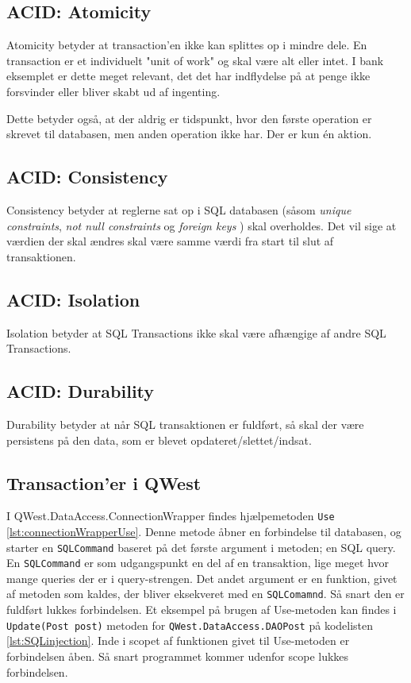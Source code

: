 \subsection{ACID: Atomicity}\label{sec:acidAtomic}
Atomicity betyder at transaction'en ikke kan splittes op i mindre dele. En transaction er et individuelt "unit of work" og skal være alt eller intet. \cite{DistributedSystems} I bank eksemplet er dette meget relevant, det det har indflydelse på at penge ikke forsvinder eller bliver skabt ud af ingenting. 

Dette betyder også, at der aldrig er tidspunkt, hvor den første operation er skrevet til databasen, men anden operation ikke har. Der er kun én aktion.

\subsection{ACID: Consistency}\label{sec:acidConsistent}
Consistency betyder at reglerne sat op i SQL databasen (såsom \textit{unique constraints}, \textit{not null constraints} og \textit{foreign keys} \cite{SqlConstraints}) skal overholdes. Det vil sige at værdien der skal ændres skal være samme værdi fra start til slut af transaktionen.

\subsection{ACID: Isolation}\label{sec:acidIsolated}
Isolation betyder at SQL Transactions ikke skal være afhængige af andre SQL Transactions.

\subsection{ACID: Durability}\label{sec:acidDurable}
Durability betyder at når SQL transaktionen er fuldført, så skal der være persistens på den data, som er blevet opdateret/slettet/indsat.

\subsection{Transaction'er i QWest}\label{sec:transactionQwest}
I QWest.DataAccess.ConnectionWrapper findes hjælpemetoden \texttt{Use} \ref{lst:connectionWrapperUse}. Denne metode åbner en forbindelse til databasen, og starter en \texttt{SQLCommand} baseret på det første argument i metoden; en SQL query. En \texttt{SQLCommand} er som udgangspunkt en del af en transaktion, lige meget hvor mange queries der er i query-strengen. Det andet argument er en funktion, givet af metoden som kaldes, der bliver eksekveret med en \texttt{SQLComamnd}. Så snart den er fuldført lukkes forbindelsen. Et eksempel på brugen af Use-metoden kan findes i \texttt{Update(Post post)} metoden for \texttt{QWest.DataAccess.DAOPost} på kodelisten \ref{lst:SQLinjection}. Inde i scopet af funktionen givet til Use-metoden er forbindelsen åben. Så snart programmet kommer udenfor scope lukkes forbindelsen.

